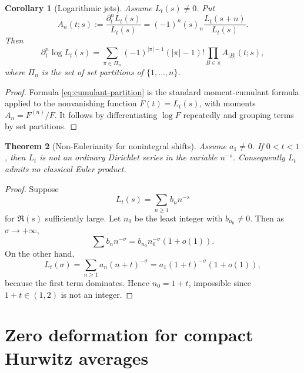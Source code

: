 \documentclass[11pt]{article}
\newcommand{\1}{\mathbf 1}
\newtheorem{theorem}{Theorem}[section]
\newtheorem{corollary}[theorem]{Corollary}
\numberwithin{equation}{section}
\begin{document}
\begin{corollary}[Logarithmic jets]\label{cor:log-jets}
Assume $L_t(s)\ne0$.  Put
\begin{equation}
  A_n(t;s):=\frac{\partial_t^nL_t(s)}{L_t(s)}
  =(-1)^n(s)_n\frac{L_t(s+n)}{L_t(s)}.
\end{equation}
Then
\begin{equation}\label{eq:cumulant-partition}
  \partial_t^n\log L_t(s)
  =\sum_{\pi\in\Pi_n}(-1)^{|\pi|-1}(|\pi|-1)!\prod_{B\in\pi}A_{|B|}(t;s),
\end{equation}
where $\Pi_n$ is the set of set partitions of $\{1,\dots,n\}$.
\end{corollary}

\begin{proof}
Formula \eqref{eq:cumulant-partition} is the standard moment-cumulant formula applied to the nonvanishing function $F(t)=L_t(s)$, with moments $A_n=F^{(n)}/F$.  It follows by differentiating $\log F$ repeatedly and grouping terms by set partitions.
\end{proof}

\begin{theorem}[Non-Eulerianity for nonintegral shifts]\label{thm:non-eulerianity}
Assume $a_1\ne0$.  If $0<t<1$, then $L_t$ is not an ordinary Dirichlet series in the variable $n^{-s}$.  Consequently $L_t$ admits no classical Euler product.
\end{theorem}

\begin{proof}
Suppose
\begin{equation}
  L_t(s)=\sum_{n\ge1}b_n n^{-s}
\end{equation}
for $\Re(s)$ sufficiently large.  Let $n_0$ be the least integer with $b_{n_0}\ne0$.  Then as $\sigma\to+\infty$,
\begin{equation}
  \sum b_n n^{-\sigma}=b_{n_0}n_0^{-\sigma}(1+o(1)).
\end{equation}
On the other hand,
\begin{equation}
  L_t(\sigma)=\sum_{n\ge1}a_n(n+t)^{-\sigma}=a_1(1+t)^{-\sigma}(1+o(1)),
\end{equation}
because the first term dominates.  Hence $n_0=1+t$, impossible since $1+t\in(1,2)$ is not an integer.
\end{proof}

\section{Zero deformation for compact Hurwitz averages}\label{sec:zero-deformation}
\end{document}
